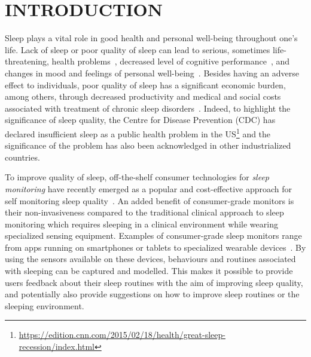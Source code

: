 \section{INTRODUCTION}\label{sec:1introduction}

Sleep plays a vital role in good health and personal well-being throughout one's life. Lack of sleep or poor quality of sleep can lead to
serious, sometimes life-threatening, health problems~\cite{altena2008sleep,chandola2010effect,lallukka2016contribution}, decreased level of
cognitive performance~\cite{alhola07sleep,akerstedt07altered}, and changes in mood and feelings of personal well-being~\cite{paunio09longitudinal,pilcher97sleep}.
Besides having an adverse effect to individuals, poor quality of sleep has a significant economic burden, among others, through decreased productivity and medical and social costs
associated with treatment of chronic sleep disorders~\cite{hafner17why}. Indeed, to highlight the significance of sleep quality, the Centre for Disease Prevention (CDC) has declared insufficient sleep
as a public health problem in the US\footnote{\url{https://edition.cnn.com/2015/02/18/health/great-sleep-recession/index.html}} and the significance of the problem has also been
acknowledged in other industrialized countries.

To improve quality of sleep, off-the-shelf consumer technologies for \emph{sleep monitoring} have recently emerged as a popular and
cost-effective approach for self monitoring sleep quality~\cite{ko15consumer}. An added benefit of consumer-grade monitors is their
non-invasiveness compared to the traditional clinical approach to sleep monitoring which requires sleeping in a clinical environment while
wearing specialized sensing equipment. Examples of consumer-grade sleep monitors range from apps running on smartphones or tablets to
specialized wearable devices~\cite{zeo,Jawbone,SleepAndroid,fitbit,gu2016sleep,sleepmonitor}. By using the sensors available on these
devices, behaviours and routines associated with sleeping can be captured and modelled. This makes it possible to provide users feedback
about their sleep routines with the aim of improving sleep quality, and potentially also provide suggestions on how to improve sleep
routines or the sleeping environment.


